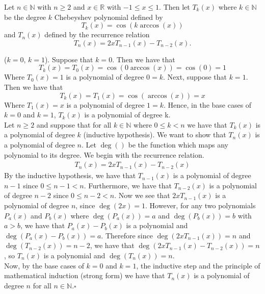 \documentclass[11pt, letterpaper]{article}
\begin{document}
\begin{prf}[by induction]
    Let $n\in\mathbb{N}$ with $n\geq 2$ and $x\in\mathbb{R}$ with $-1\leq x\leq 1$. Then let $T_k(x)$ where $k\in\mathbb{N}$ be the degree $k$ 
    Chebeyshev polynomial defined by 
    \[T_k(x)=\cos(k\arccos(x))\]
    and $T_n(x)$ defined by the recurrence relation
    \[T_n(x)=2xT_{n-1}(x)-T_{n-2}(x).\]

    ($k=0$, $k=1$). Suppose that $k=0$. Then we have that 
    \[T_k(x)=T_0(x)=\cos(0\arccos(x))=\cos(0)=1\]
    Where $T_0(x)=1$ is a polynomial of degree $0=k$.
    Next, suppose that $k=1$. Then we have that
    \[T_k(x)=T_1(x)=\cos(\arccos(x))=x\]
    Where $T_1(x)=x$ is a polynomial of degree $1=k$. Hence, in the base cases of $k=0$ and $k=1$,
    $T_k(x)$ is a polynomial of degree k.\\

     Let $n\geq 2$ and suppose that for all $k\in\mathbb{N}$ where $0\leq k<n$
    we have that $T_k(x)$ is a polynomial of degree $k$ (inductive hypothesis). We want to show that
    $T_n(x)$ is a polynomial of degree $n$. Let $\deg()$ be the function which maps any polynomial to its degree. 
    We begin with the recurrence relation.
    \begin{align*}
        T_n(x)=2xT_{n-1}(x)-T_{n-2}(x)
    \end{align*}
    By the inductive hypothesis, we have that $T_{n-1}(x)$ is a polynomial of degree $n-1$ since $0\leq n-1<n$. 
    Furthermore, we have that $T_{n-2}(x)$ is a polynomial of degree $n-2$ since $0\leq n-2<n$. 
    Now we see that $2xT_{n-1}(x)$ is a polynomial of degree $n$, since $\deg(2x)=1$. However, for any two polynomials
    $P_a(x)$ and $P_b(x)$ where $\deg(P_a(x))=a$ and $\deg(P_b(x))=b$ with $a>b$, we have that $P_a(x)-P_b(x)$ is a polynomial and $\deg(P_a(x)-P_b(x))=a$. 
    Therefore since $\deg(2xT_{n-1}(x))=n$ and $\deg(T_{n-2}(x))=n-2$, we have that $\deg(2xT_{n-1}(x)-T_{n-2}(x))=n$,
    so $T_n(x)$ is a polynomial and $\deg(T_n(x))=n$.\\

    \noindent Now, by the base cases of $k=0$ and $k=1$, the inductive step and the principle of mathematical induction
    (strong form) we have that $T_n(x)$ is a polynomial of degree $n$ for all $n\in\mathbb{N}$.\indent\indent\indent\indent\indent\indent\indent\indent\indent\indent $\square$
\end{prf}
\end{document}
